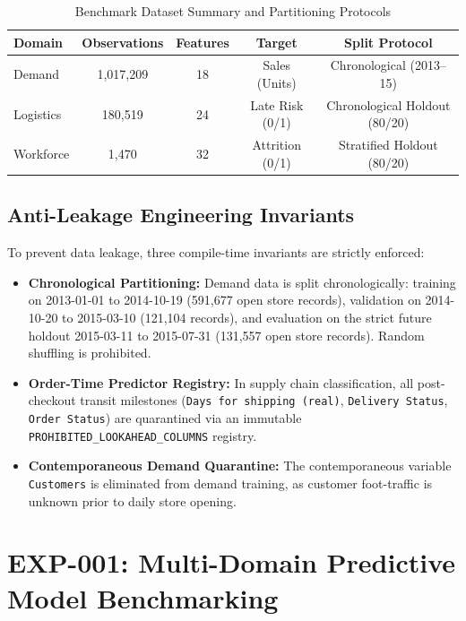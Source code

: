 \documentclass[10pt,conference]{IEEEtran}
\begin{document}
\begin{table}[htbp]
\caption{Benchmark Dataset Summary and Partitioning Protocols}
\begin{center}
\begin{tabular}{lcccc}
\toprule
\textbf{Domain} & \textbf{Observations} & \textbf{Features} & \textbf{Target} & \textbf{Split Protocol} \\
\midrule
Demand & 1,017,209 & 18 & Sales (Units) & Chronological (2013--15) \\
Logistics & 180,519 & 24 & Late Risk (0/1) & Chronological Holdout (80/20) \\
Workforce & 1,470 & 32 & Attrition (0/1) & Stratified Holdout (80/20) \\
\bottomrule
\end{tabular}
\label{tab:datasets}
\end{center}
\end{table}

\subsection{Anti-Leakage Engineering Invariants}
To prevent data leakage, three compile-time invariants are strictly enforced:
\begin{itemize}
    \item \textbf{Chronological Partitioning:} Demand data is split chronologically: training on 2013-01-01 to 2014-10-19 (591,677 open store records), validation on 2014-10-20 to 2015-03-10 (121,104 records), and evaluation on the strict future holdout 2015-03-11 to 2015-07-31 (131,557 open store records). Random shuffling is prohibited.
    \item \textbf{Order-Time Predictor Registry:} In supply chain classification, all post-checkout transit milestones (\texttt{Days for shipping (real)}, \texttt{Delivery Status}, \texttt{Order Status}) are quarantined via an immutable \texttt{PROHIBITED\_LOOKAHEAD\_COLUMNS} registry.
    \item \textbf{Contemporaneous Demand Quarantine:} The contemporaneous variable \texttt{Customers} is eliminated from demand training, as customer foot-traffic is unknown prior to daily store opening.
\end{itemize}

\section{EXP-001: Multi-Domain Predictive Model Benchmarking}
\end{document}
